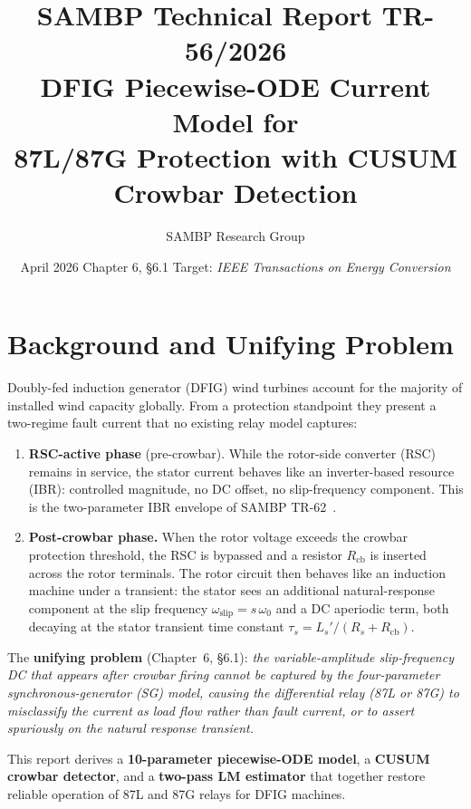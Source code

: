 \documentclass[11pt,a4paper]{article}
\title{%
  \textbf{\textsf{\color{sambpblue}SAMBP Technical Report TR-56/2026}}\\[6pt]
  \Large DFIG Piecewise-ODE Current Model for\\
  87L/87G Protection with CUSUM Crowbar Detection%
}
\author{SAMBP Research Group}
\date{April 2026 \quad\textbar\quad Chapter 6, \S6.1 \quad\textbar\quad
      Target: \emph{IEEE Transactions on Energy Conversion}}
\newcommand{\omegaz}{\omega_0}
\newcommand{\omegas}{\omega_{\text{slip}}}
\newcommand{\taus}{\tau_s}
\begin{document}
\maketitle
\thispagestyle{empty}
\tableofcontents
\clearpage

\section{Background and Unifying Problem}
\label{sec:background}

Doubly-fed induction generator (DFIG) wind turbines account for the majority
of installed wind capacity globally.  From a protection standpoint they
present a two-regime fault current that no existing relay model captures:

\begin{enumerate}
  \item \textbf{RSC-active phase} (pre-crowbar).  While the rotor-side
        converter (RSC) remains in service, the stator current behaves like
        an inverter-based resource (IBR): controlled magnitude, no DC offset,
        no slip-frequency component.  This is the two-parameter IBR envelope
        of SAMBP TR-62~\cite{TR62}.

  \item \textbf{Post-crowbar phase.}  When the rotor voltage exceeds the
        crowbar protection threshold, the RSC is bypassed and a resistor
        $R_{\text{cb}}$ is inserted across the rotor terminals.  The rotor
        circuit then behaves like an induction machine under a transient:
        the stator sees an additional natural-response component at the slip
        frequency $\omegas = s\,\omegaz$ and a DC aperiodic term, both
        decaying at the stator transient time constant
        $\taus = L_s'/(R_s + R_{\text{cb}})$.
\end{enumerate}

The \textbf{unifying problem} (Chapter~6, \S6.1): \emph{the variable-amplitude
slip-frequency DC that appears after crowbar firing cannot be captured by the
four-parameter synchronous-generator (SG) model, causing the differential
relay (87L or 87G) to misclassify the current as load flow rather than fault
current, or to assert spuriously on the natural response transient.}

This report derives a \textbf{10-parameter piecewise-ODE model}, a
\textbf{CUSUM crowbar detector}, and a \textbf{two-pass LM estimator} that
together restore reliable operation of 87L and 87G relays for DFIG machines.
\end{document}
